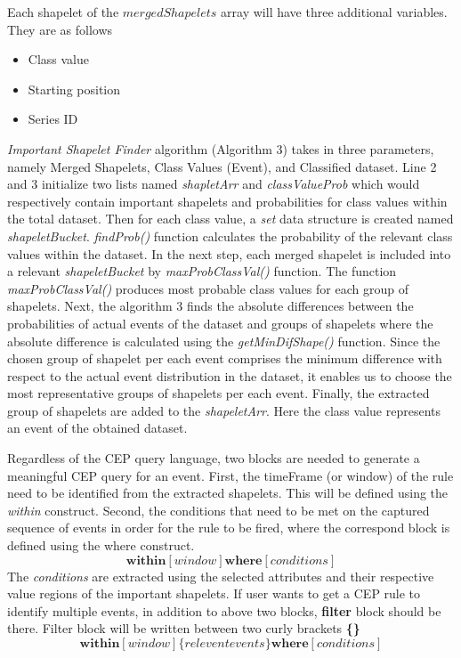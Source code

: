 \documentclass[conference]{IEEEtran}  %
\begin{document}
Each shapelet of the $mergedShapelets$ array will have three additional variables. They are as follows
\begin{itemize}
\item Class value
\item Starting position
\item Series ID
\end{itemize}

\textit{Important Shapelet Finder} algorithm (Algorithm 3) takes in three parameters, namely Merged Shapelets, Class Values (Event), and Classified dataset. Line 2 and 3 initialize two lists named \textit{shapletArr} and \textit{classValueProb} which would respectively contain important shapelets and probabilities for class values within the total dataset. Then for each class value, a \textit{set} data structure is created named \textit{shapeletBucket}. \textit{findProb()} function calculates the probability of the relevant class values within the dataset. In the next step, each merged shapelet is included into a relevant \textit{shapeletBucket} by \textit{maxProbClassVal()} function. The function \textit{maxProbClassVal()} produces most probable class values for each group of shapelets. Next, the algorithm 3 finds the absolute differences between the probabilities of actual events of the dataset and groups of shapelets where the absolute difference is calculated using the \textit{getMinDifShape()} function. Since the chosen group of shapelet per each event comprises the minimum difference with respect to the actual event distribution in the dataset, it enables us to choose the most representative groups of shapelets per each event. Finally, the extracted group of shapelets are added to the \textit{shapeletArr}. Here the class value represents an event of the obtained dataset.

Regardless of the CEP query language, two blocks are needed to generate a meaningful CEP query for an event. First, the timeFrame (or window) of the rule need to be identified from the extracted shapelets. This will be defined using the \textit{within} construct. Second, the conditions that need to be met on the captured sequence of events in order for the rule to be fired, where the correspond block is defined using the where construct. 
\vspace{0.1cm}
\begin{equation}
\textbf{within}[window] \textbf{where}[conditions]
\label{eq:withinWhere}
\end{equation}
 The \textit{conditions} are extracted using the selected attributes and their respective value regions of the important shapelets. If user wants to get a CEP rule to identify multiple events, in addition to above two blocks, \textbf{filter} block should be there. Filter block will be written between two curly brackets \textbf{\{\}}
\begin{equation}
\textbf{within}[window] \{relevent events\} \textbf{where}[conditions]
\label{eq:releventEvents}
\end{equation}
\end{document}
